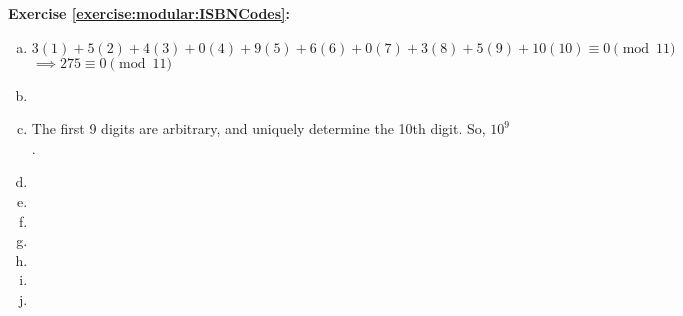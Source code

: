 \noindent\textbf{Exercise \ref{exercise:modular:ISBNCodes}:}
\begin{enumerate}[(a)]
\item
$3(1)+5(2)+4(3)+0(4)+9(5)+6(6)+0(7)+3(8)+5(9)+10(10) \equiv 0 \pmod{11}$\\
$\implies 275 \equiv 0 \pmod{11}$

\item
 
 \item
The first 9 digits are arbitrary, and uniquely determine the 10th digit. So, $10^9$.

\item

\item

\item
  
 \item
 
 \item

\item

\item

\end{enumerate}

